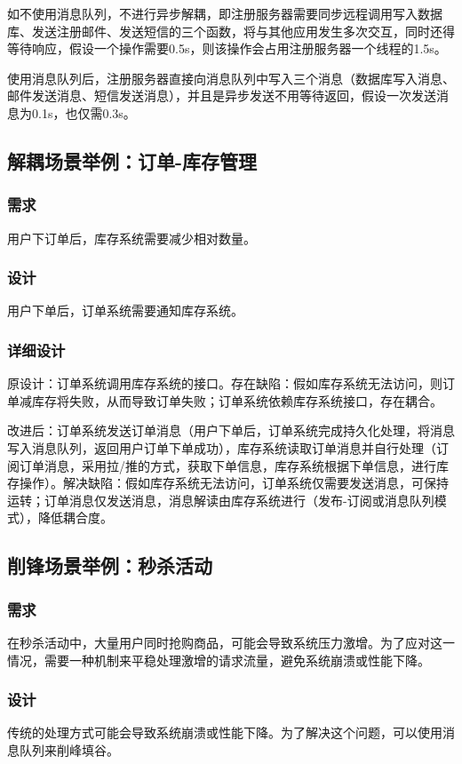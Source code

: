 \documentclass[11pt, a4paper, oneside]{ctexbook}
\begin{document}
如不使用消息队列，不进行异步解耦，即注册服务器需要同步远程调用写入数据库、发送注册邮件、发送短信的三个函数，将与其他应用发生多次交互，同时还得等待响应，假设一个操作需要0.5s，则该操作会占用注册服务器一个线程的1.5s。

使用消息队列后，注册服务器直接向消息队列中写入三个消息（数据库写入消息、邮件发送消息、短信发送消息），并且是异步发送不用等待返回，假设一次发送消息为0.1s，也仅需0.3s。

\subsection{解耦场景举例：订单-库存管理}
\subsubsection{需求}用户下订单后，库存系统需要减少相对数量。

\subsubsection{设计}
用户下单后，订单系统需要通知库存系统。

\subsubsection{详细设计}
原设计：订单系统调用库存系统的接口。存在缺陷：假如库存系统无法访问，则订单减库存将失败，从而导致订单失败；订单系统依赖库存系统接口，存在耦合。

改进后：订单系统发送订单消息（用户下单后，订单系统完成持久化处理，将消息写入消息队列，返回用户订单下单成功），库存系统读取订单消息并自行处理（订阅订单消息，采用拉/推的方式，获取下单信息，库存系统根据下单信息，进行库存操作）。解决缺陷：假如库存系统无法访问，订单系统仅需要发送消息，可保持运转；订单消息仅发送消息，消息解读由库存系统进行（发布-订阅或消息队列模式），降低耦合度。

\subsection{削锋场景举例：秒杀活动}
\subsubsection{需求}在秒杀活动中，大量用户同时抢购商品，可能会导致系统压力激增。为了应对这一情况，需要一种机制来平稳处理激增的请求流量，避免系统崩溃或性能下降。

\subsubsection{设计}
传统的处理方式可能会导致系统崩溃或性能下降。为了解决这个问题，可以使用消息队列来削峰填谷。
\end{document}
